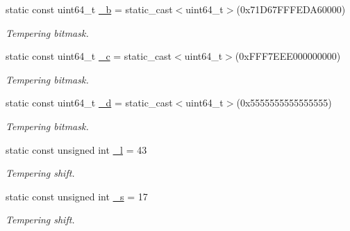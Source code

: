 \begin{DoxyCompactItemize}
static const uint64\+\_\+t \hyperlink{classsamp_files_1_1_generate_m_t_a5a90cd28215ac0b3272c1a3480bf56ce}{\+\_\+b} = static\+\_\+cast$<$uint64\+\_\+t$>$(0x71\+D67\+F\+F\+F\+E\+D\+A60000)
\begin{DoxyCompactList}\small\item\em Tempering bitmask. \end{DoxyCompactList}\item 
\mbox{\label{classsamp_files_1_1_generate_m_t_a8abca1c01d475316b80e0d7b7e23e88d}} 
static const uint64\+\_\+t \hyperlink{classsamp_files_1_1_generate_m_t_a8abca1c01d475316b80e0d7b7e23e88d}{\+\_\+c} = static\+\_\+cast$<$uint64\+\_\+t$>$(0x\+F\+F\+F7\+E\+E\+E000000000)
\begin{DoxyCompactList}\small\item\em Tempering bitmask. \end{DoxyCompactList}\item 
\mbox{\label{classsamp_files_1_1_generate_m_t_ab4c0a3714189a167cb6d0d0cf33df694}} 
static const uint64\+\_\+t \hyperlink{classsamp_files_1_1_generate_m_t_ab4c0a3714189a167cb6d0d0cf33df694}{\+\_\+d} = static\+\_\+cast$<$uint64\+\_\+t$>$(0x5555555555555555)
\begin{DoxyCompactList}\small\item\em Tempering bitmask. \end{DoxyCompactList}\item 
\mbox{\label{classsamp_files_1_1_generate_m_t_a5ab9c0985b9fd3de64316f580c2eba7d}} 
static const unsigned int \hyperlink{classsamp_files_1_1_generate_m_t_a5ab9c0985b9fd3de64316f580c2eba7d}{\+\_\+l} = 43
\begin{DoxyCompactList}\small\item\em Tempering shift. \end{DoxyCompactList}\item 
\mbox{\label{classsamp_files_1_1_generate_m_t_aaae970a607ffdb407b1bdf1e5762c92d}} 
static const unsigned int \hyperlink{classsamp_files_1_1_generate_m_t_aaae970a607ffdb407b1bdf1e5762c92d}{\+\_\+s} = 17
\begin{DoxyCompactList}\small\item\em Tempering shift. \end{DoxyCompactList}\item 

\end{DoxyCompactItemize}
